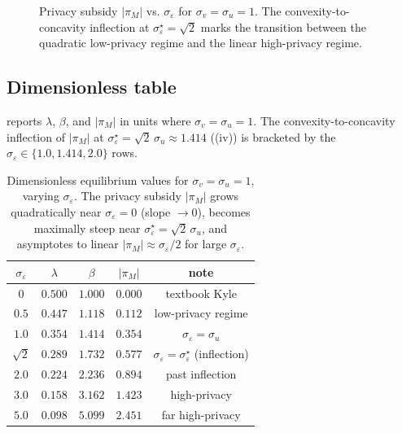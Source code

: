\documentclass[runningheads]{llncs}
\newcommand{\sigv}{\sigma_v}
\newcommand{\sigu}{\sigma_u}
\newcommand{\sige}{\sigma_\varepsilon}
\begin{document}
\begin{figure}[H]
\centering
{}
\caption{Privacy subsidy $|\pi_M|$ vs. $\sige$ for
$\sigv = \sigu = 1$. The convexity-to-concavity inflection at
$\sige^\star = \sqrt{2}$ marks the transition between the quadratic
low-privacy regime and the linear high-privacy regime.}
\label{fig:subsidy}
\end{figure}

\subsection{Dimensionless table}

 reports $\lambda$, $\beta$, and $|\pi_M|$
in units where $\sigv = \sigu = 1$. The convexity-to-concavity
inflection of $|\pi_M|$ at $\sige^\star = \sqrt{2}\,\sigu \approx
1.414$ ((iv)) is bracketed by the
$\sige \in \{1.0, 1.414, 2.0\}$ rows.

\begin{table}[H]
\centering
\begin{tabular}{c|ccc|c}
$\sige$ & $\lambda$ & $\beta$ & $|\pi_M|$ & note \\
\hline
$0$    & $0.500$ & $1.000$ & $0.000$ & textbook Kyle \\
$0.5$  & $0.447$ & $1.118$ & $0.112$ & low-privacy regime \\
$1.0$  & $0.354$ & $1.414$ & $0.354$ & $\sige = \sigu$ \\
$\sqrt{2}$ & $0.289$ & $1.732$ & $0.577$ & $\sige = \sige^\star$ (inflection) \\
$2.0$  & $0.224$ & $2.236$ & $0.894$ & past inflection \\
$3.0$  & $0.158$ & $3.162$ & $1.423$ & high-privacy \\
$5.0$  & $0.098$ & $5.099$ & $2.451$ & far high-privacy \\
\end{tabular}
\caption{Dimensionless equilibrium values for
$\sigv = \sigu = 1$, varying $\sige$. The privacy subsidy
$|\pi_M|$ grows quadratically near $\sige = 0$ (slope $\to 0$),
becomes maximally steep near $\sige^\star = \sqrt{2}\,\sigu$, and
asymptotes to linear $|\pi_M| \approx \sige/2$ for large $\sige$.}
\label{tab:dimensionless}
\end{table}
\end{document}
